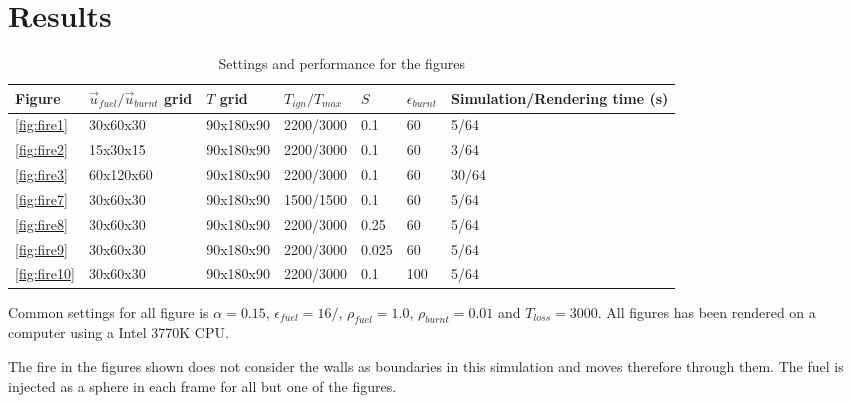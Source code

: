 \section{Results}

\begin{table}[h!]\footnotesize
\caption{Settings and performance for the figures}
\begin{tabular}{lllllll}
\hline
Figure & $\vec{u}_{fuel}/\vec{u}_{burnt}$ grid & $T$ grid & $T_{ign}/T_{max}$ & $S$ & $\epsilon_{burnt}$ & Simulation/Rendering time (s) \\
\hline
\ref{fig:fire1}      &	30x60x30	&	90x180x90	&	2200/3000	&	0.1	&		60	&	5/64	\\
\ref{fig:fire2}      &	15x30x15	&	90x180x90	&	2200/3000	&	0.1	&		60	&	3/64	\\
\ref{fig:fire3}      &	60x120x60	&	90x180x90	&	2200/3000	&	0.1	&		60	&	30/64	\\
\ref{fig:fire7}      &	30x60x30	&	90x180x90	&	1500/1500	&	0.1	&		60	&	5/64	\\
\ref{fig:fire8}      &	30x60x30	&	90x180x90	&	2200/3000	&	0.25	&	60	&	5/64	\\
\ref{fig:fire9}      &	30x60x30	&	90x180x90	&	2200/3000	&	0.025	&	60	&	5/64	\\
\ref{fig:fire10}     &	30x60x30	&	90x180x90	&	2200/3000	&	0.1		&	100	&	5/64	\\
\hline
\end{tabular}
\end{table}

Common settings for all figure is $\alpha = 0.15$, $\epsilon_{fuel} = 16/$,  $\rho_{fuel} = 1.0$, $\rho_{burnt} = 0.01$ and $T_{loss} = 3000$. All figures has been rendered on a computer using a Intel 3770K CPU. 

The fire in the figures shown does not consider the walls as boundaries in this simulation and moves therefore through them. The fuel is injected as a sphere in each frame for all but one of the figures.

